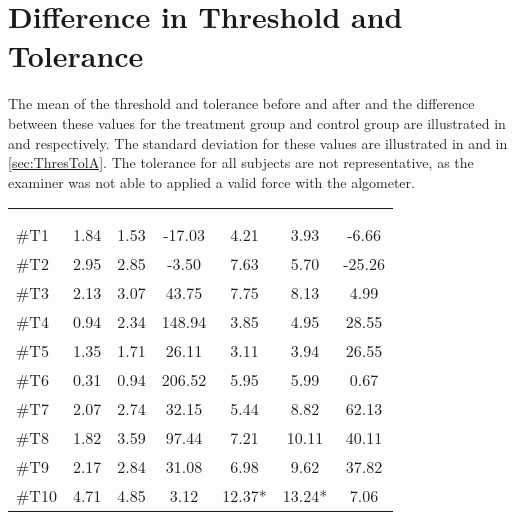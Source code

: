 \section{Difference in Threshold and Tolerance}
The mean of the threshold and tolerance before and after and the difference between these values for the treatment group and control group are illustrated in   and  respectively. The standard deviation for these values are illustrated in  and  in \autoref{sec:ThresTolA}. The tolerance for all subjects are not representative, as the examiner was not able to applied a valid force with the algometer. 

\begin{longtable} {l|c|c|c|c|c|c}
 \rowcolor[HTML]{C0C0C0} 
  \color[HTML]{000000}{} & 
 \multicolumn{3}{c|}{ \color[HTML]{000000}{\textbf{Threshold}}} & \multicolumn{3}{c}{ \color[HTML]{000000}{\textbf{Tolerance}}}  	\\  \rule{0pt}{3ex} 
  \cellcolor[HTML]{C0C0C0}{} &
 \multicolumn{1}{c|}{ \cellcolor[HTML]{C0C0C0}{Pre [KgF]}} & \multicolumn{1}{c|}{ \cellcolor[HTML]{C0C0C0}{Post [KgF]}} 
 & \multicolumn{1}{c}{ \cellcolor[HTML]{C0C0C0}{\textcolor[HTML]{C0C0C0}{0}Diff [\%]\textcolor[HTML]{C0C0C0}{0}}}
 & \multicolumn{1}{|c|}{ \cellcolor[HTML]{C0C0C0}{Pre [KgF]}} 
 & \multicolumn{1}{c|}{ \cellcolor[HTML]{C0C0C0}{Post [KgF]}} 
 & \multicolumn{1}{c}{ \cellcolor[HTML]{C0C0C0}{\textcolor[HTML]{C0C0C0}{0}Diff [\%]\textcolor[HTML]{C0C0C0}{0}}}  	\\ \hline 
\#T1 & 1.84 & 1.53 & -17.03 & 4.21 & 3.93 & -6.66 \\ \hline
\#T2 & 2.95 & 2.85  & -3.50 & 7.63  & 5.70 & -25.26 \\ \hline
\#T3 & 2.13 & 3.07 & 43.75 & 7.75 & 8.13 & 4.99 \\ \hline
\#T4 & 0.94 & 2.34  & 148.94  & 3.85 & 4.95 & 28.55 \\ \hline
\#T5 & 1.35 & 1.71  & 26.11 & 3.11 & 3.94 & 26.55 \\ \hline	
\#T6 & 0.31 & 0.94   & 206.52 & 5.95 & 5.99 & 0.67 \\ \hline
\#T7 & 2.07 & 2.74  & 32.15 & 5.44 & 8.82 & 62.13 \\ \hline
\#T8 & 1.82 & 3.59 & 97.44 & 7.21 & 10.11 & 40.11 \\ \hline
\#T9 & 2.17 & 2.84  & 31.08 & 6.98 & 9.62 & 37.82 \\ \hline
\#T10 & 4.71 & 4.85  & 3.12 & 12.37*  & 13.24* & 7.06 \\ \hline

\end{longtable}
